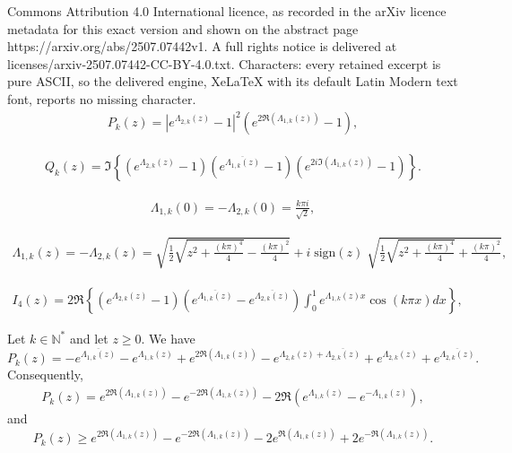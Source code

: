 \documentclass[10pt,a4paper]{amsart}
\newcommand{\be}{\begin{equation}}
\newcommand{\ee}{\end{equation}}
\newcommand{\mN}{\mathbb{N}}
\begin{document}
Commons Attribution 4.0 International licence, as recorded in the arXiv licence metadata for this exact version and shown on the abstract page https://arxiv.org/abs/2507.07442v1. A full rights notice is delivered at licenses/arxiv-2507.07442-CC-BY-4.0.txt. Characters: every retained excerpt is pure ASCII, so the delivered engine, XeLaTeX with its default Latin Modern text font, reports no missing character.
\begin{align} 	\label{def-Pk}
P_k (z) = \left|e^{\Lambda_{2,k}(z)} - 1 \right|^2 \left(e^{2\Re (\Lambda_{1,k}(z))} - 1 \right),   
\end{align}

\begin{align}	\label{def-Qk}
Q_k (z) = \Im \left\{ \left(e^{\Lambda_{2,k}(z)} - 1 \right) \left( e^{\overline{\Lambda_{1,k}(z)}} - 1 \right) \left(e^{2 i \Im (\Lambda_{1,k}(z))} - 1 \right) \right\}. 
\end{align}

\begin{align} 	\label{Lamdaat0}  
\Lambda_{1,k}(0) = - \Lambda_{2,k}(0) = \displaystyle \frac{k \pi i}{\sqrt{2}},
\end{align}

\begin{align}
\label{sqroot}
    \Lambda_{1,k}(z) = - \Lambda_{2,k}(z) = \sqrt{\frac{1}{2}\sqrt{z^2 + \frac{(k \pi)^4}{4} } - \frac{(k \pi)^2}{4} } + i \; \mathrm{sign}(z) \; \sqrt{\frac{1}{2}\sqrt{z^2 + \frac{(k \pi)^4}{4}} + \frac{(k \pi)^2}{4}},
\end{align}  

 \begin{align}    \label{defI4}
 I_4(z) = 2\Re \left\{ \left(e^{\Lambda_{2,k}(z)} - 1 \right)  \left(e^{\overline{\Lambda_{1,k}(z)}} - e^{\overline{\Lambda_{2,k}(z)}} \right) \int_0^1 e^{\Lambda_{1,k}(z) x} \cos(k \pi x) dx \right\},  
\end{align}

\begin{lemma} \label{lem-Pk} Let $k \in \mN^*$ and let $z \geq 0$. We have
\be \label{lem-Pk-cl1}
P_k(z) = - e^{\overline{\Lambda_{1, k}(z)}} - e^{\Lambda_{1, k}(z)} + e^{2 \Re (\Lambda_{1, k}(z))}
- e^{\Lambda_{2, k}(z) + \overline{\Lambda_{2, k}(z)}} +  e^{\Lambda_{2, k}(z)} + e^{\overline{\Lambda_{2, k}(z)}}. 
\ee 
Consequently, 
\begin{align}\label{lem-Pk-cl2}
P_k(z) =
e^{2\Re (\Lambda_{1,k}(z))} - e^{-2\Re (\Lambda_{1,k}(z))}  - 2 \Re \left(e^{ \Lambda_{1,k}(z)} - e^{-\Lambda_{1,k}(z)} \right),
\end{align}
and
\be 	\label{lem-Pk-cl3}
P_k(z) \geq
e^{2\Re (\Lambda_{1,k}(z))} - e^{-2\Re (\Lambda_{1,k}(z))}  - 2 e^{ \Re(\Lambda_{1,k}(z))} + 2 e^{-\Re (\Lambda_{1,k}(z))}.
\ee
\end{lemma}
\end{document}
